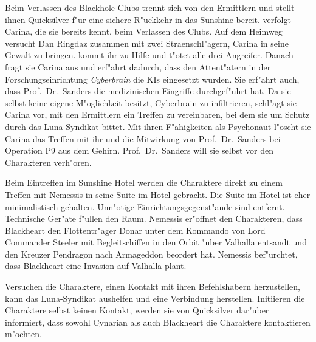 

Beim Verlassen des Blackhole Clubs trennt sich \xl{} von den Ermittlern und stellt ihnen Quicksilver f"ur eine sichere R"uckkehr in das Sunshine bereit. \xl{} verfolgt Carina, die sie bereits kennt, beim Verlassen des Clubs. Auf dem Heimweg versucht Dan Ringdaz zusammen mit zwei Stra\3enschl"agern, Carina in seine Gewalt zu bringen. \xl{} kommt ihr zu Hilfe und t"otet alle drei Angreifer. Danach fragt sie Carina aus und erf"ahrt dadurch, dass den Attent"atern in der Forschungseinrichtung \emph{Cyberbrain} die KIs eingesetzt wurden. Sie erf"ahrt auch, dass Prof.~Dr.~Sanders die medizinischen Eingriffe durchgef"uhrt hat. Da sie selbst keine eigene M"oglichkeit besitzt, Cyberbrain zu infiltrieren, schl"agt sie Carina vor, mit den Ermittlern ein Treffen zu vereinbaren, bei dem sie um Schutz durch das Luna-Syndikat bittet. Mit ihren F"ahigkeiten als Psychonaut l"oscht sie Carina das Treffen mit ihr und die Mitwirkung von Prof.~Dr.~Sanders bei Operation P9 aus dem Gehirn. Prof.~Dr.~Sanders will sie selbst vor den Charakteren verh"oren.


Beim Eintreffen im Sunshine Hotel werden die Charaktere direkt zu einem Treffen mit Nemessis in seine Suite im Hotel gebracht. Die Suite im Hotel ist eher minimalistisch gehalten. Unn"otige Einrichtungsgegenst"ande sind entfernt. Technische Ger"ate f"ullen den Raum. Nemessis er"offnet den Charakteren, dass Blackheart den Flottentr"ager Donar unter dem Kommando von Lord Commander Steeler mit Begleitschiffen in den Orbit "uber Valhalla entsandt und den Kreuzer Pendragon nach Armageddon beordert hat. Nemessis bef"urchtet, dass Blackheart eine Invasion auf Valhalla plant.

Versuchen die Charaktere, einen Kontakt mit ihren Befehlshabern herzustellen, kann das Luna-Syndikat aushelfen und eine Verbindung herstellen. Initiieren die Charaktere selbst keinen Kontakt, werden sie von Quicksilver dar"uber informiert, dass sowohl Cynarian als auch Blackheart die Charaktere kontaktieren m"ochten.


